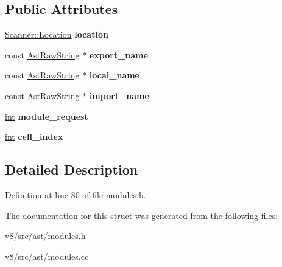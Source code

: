 \subsection*{Public Attributes}
\begin{DoxyCompactItemize}
\item 
\mbox{\label{structv8_1_1internal_1_1ModuleDescriptor_1_1Entry_ae4b36f96b7e451d8c57a82c40cc6d140}} 
\mbox{\hyperlink{structv8_1_1internal_1_1Scanner_1_1Location}{Scanner\+::\+Location}} {\bfseries location}
\item 
\mbox{\label{structv8_1_1internal_1_1ModuleDescriptor_1_1Entry_ab11c431d037815c0e0c33c5994373b53}} 
const \mbox{\hyperlink{classv8_1_1internal_1_1AstRawString}{Ast\+Raw\+String}} $\ast$ {\bfseries export\+\_\+name}
\item 
\mbox{\label{structv8_1_1internal_1_1ModuleDescriptor_1_1Entry_af4a8e525214fb3411d416016864667e9}} 
const \mbox{\hyperlink{classv8_1_1internal_1_1AstRawString}{Ast\+Raw\+String}} $\ast$ {\bfseries local\+\_\+name}
\item 
\mbox{\label{structv8_1_1internal_1_1ModuleDescriptor_1_1Entry_a1aed5ff9792a110b554008d9c97db4ca}} 
const \mbox{\hyperlink{classv8_1_1internal_1_1AstRawString}{Ast\+Raw\+String}} $\ast$ {\bfseries import\+\_\+name}
\item 
\mbox{\label{structv8_1_1internal_1_1ModuleDescriptor_1_1Entry_ad052af0fe8e6592d8c4c572eb0cac674}} 
\mbox{\hyperlink{classint}{int}} {\bfseries module\+\_\+request}
\item 
\mbox{\label{structv8_1_1internal_1_1ModuleDescriptor_1_1Entry_a673757143323d60f0f7a97d7ed6cdc93}} 
\mbox{\hyperlink{classint}{int}} {\bfseries cell\+\_\+index}
\end{DoxyCompactItemize}


\subsection{Detailed Description}


Definition at line 80 of file modules.\+h.



The documentation for this struct was generated from the following files\+:\begin{DoxyCompactItemize}
\item 
v8/src/ast/modules.\+h\item 
v8/src/ast/modules.\+cc\end{DoxyCompactItemize}
